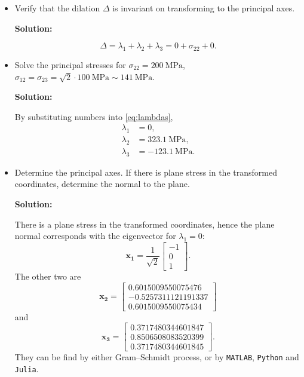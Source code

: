 \documentclass[12pt]{article}
\begin{document}
\begin{itemize}
	\item Verify that the dilation $\Delta$ is invariant on transforming to the principal axes.

	      \textbf{Solution:}

	      \begin{equation}
		      \Delta = \lambda_1 + \lambda_2 + \lambda_3 = 0 + \sigma_{22} + 0.
	      \end{equation}
	\item Solve the principal stresses for $\sigma_{22} = \SI{200}{\mega\pascal}$,
	      $\sigma_{12} = \sigma_{23} = \sqrt{2} \cdot \SI{100}{\mega\pascal} \sim \SI{141}{\mega\pascal}$.

	      \textbf{Solution:}

	      By substituting numbers into \eqref{eq:lambdas},
	      \begin{align}
		      \lambda_1 & = 0,                         \\
		      \lambda_2 & = \SI{323.1}{\mega\pascal},  \\
		      \lambda_3 & = \SI{-123.1}{\mega\pascal}.
	      \end{align}
	\item Determine the principal axes. If there is plane stress in the transformed coordinates, determine the normal to the plane.

	      \textbf{Solution:}

	      There is a plane stress in the transformed coordinates, hence the plane normal corresponds with the
	      eigenvector for $\lambda_1 = 0$:
	      \begin{equation}
		      \bm{x_1} = \frac{1}{\sqrt{2}} \begin{bmatrix}
			      -1 \\
			      0  \\
			      1
		      \end{bmatrix}.
	      \end{equation}
	      The other two are
	      \begin{equation}
		      \bm{x_2}=\begin{bmatrix}
			      0.6015009550075476  \\
			      -0.5257311121191337 \\
			      0.6015009550075434
		      \end{bmatrix}
	      \end{equation}
	      and
	      \begin{equation}
		      \bm{x_3}=\begin{bmatrix}
			      0.3717480344601847 \\
			      0.8506508083520399 \\
			      0.3717480344601845
		      \end{bmatrix}.
	      \end{equation}
	      They can be find by either Gram–Schmidt process, or by \texttt{MATLAB}, \texttt{Python} and \texttt{Julia}.
\end{itemize}




\end{document}
